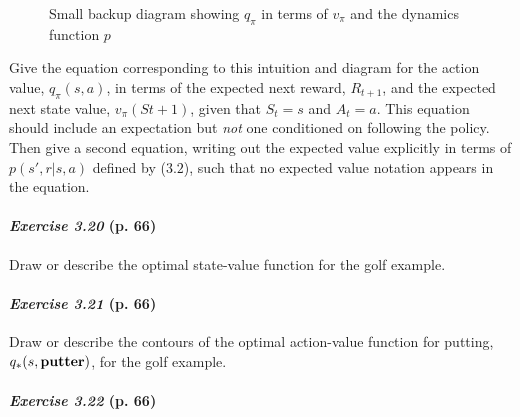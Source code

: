 \documentclass[10pt,a4paper]{article}
\begin{document}
\begin{figure}[h]
\centering
{}
\caption{Small backup diagram showing $q_\pi$ in terms of $v_\pi$ and the dynamics function $p$}
\label{relation_action_value_state_value}
\end{figure}


Give the equation corresponding to this intuition and diagram for the action value, $q_\pi(s, a)$, in terms of the expected next reward, $R_{t+1}$, and the expected next state value, $v_\pi(St+1)$, given that $S_t=s$ and $A_t=a$. This equation should include an expectation but
\textit{not} one conditioned on following the policy.
Then give a second equation, writing out the expected value explicitly in terms of $p(s', r \lvert s, a)$ defined by ($3.2$), such that no expected value notation appears in the equation.

\paragraph{\textit{Exercise 3.20} (p. 66)} 
Draw or describe the optimal state-value function for the golf example.

\paragraph{\textit{Exercise 3.21} (p. 66)} 
Draw or describe the contours of the optimal action-value function for
putting, $q_*(s, \textrm{\textbf{putter}})$, for the golf example.

\paragraph{\textit{Exercise 3.22} (p. 66)} 
\end{document}
